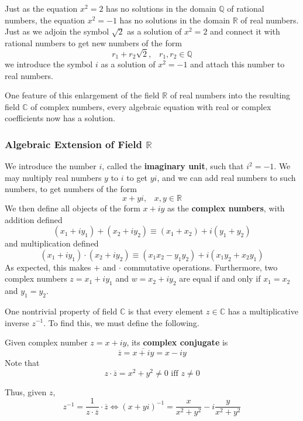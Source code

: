 \documentclass{article}
\begin{document}
    Just as the equation $x^2 = 2$ has no solutions in the domain $\mathbb{Q}$ of rational numbers, the equation $x^2 = -1$ has no solutions in the domain $\mathbb{R}$ of real numbers. Just as we adjoin the symbol $\sqrt{2}$ as a solution of $x^2 = 2$ and connect it with rational numbers to get new numbers of the form 
    \[r_1 + r_2 \sqrt{2}, \;\;\; r_1, r_2 \in \mathbb{Q}\]
    we introduce the symbol $i$ as a solution of $x^2 = -1$ and attach this number to real numbers. 

    One feature of this enlargement of the field $\mathbb{R}$ of real numbers into the resulting field $\mathbb{C}$ of complex numbers, every algebraic equation with real or complex coefficients now has a solution. 

    \subsubsection[Algebraic Extension of Field R]{Algebraic Extension of Field $\mathbb{R}$}
    We introduce the number $i$, called the \textbf{imaginary unit}, such that $i^2 = -1$. We may multiply real numbers $y$ to $i$ to get $yi$, and we can add real numbers to such numbers, to get numbers of the form 
    \[x + yi, \;\;\; x, y \in \mathbb{R}\]
    We then define all objects of the form $x + iy$ as the \textbf{complex numbers}, with addition defined
    \[(x_1 + i y_1) + (x_2 + i y_2) \equiv (x_1 + x_2) + i (y_1 + y_2)\]
    and multiplication defined
    \[(x_1 + i y_1) \cdot (x_2 + i y_2) \equiv (x_1 x_2 - y_1 y_2) + i (x_1 y_2 + x_2 y_1)\]
    As expected, this makes $+$ and $\cdot$ commutative operations. Furthermore, two complex numbers $z = x_1 + i y_1$ and $w = x_2 + i y_2$ are equal if and only if $x_1 = x_2$ and $y_1 = y_2$. 

    One nontrivial property of field $\mathbb{C}$ is that every element $z \in \mathbb{C}$ has a multiplicative inverse $z^{-1}$. To find this, we must define the following. 

    \begin{definition}
      Given complex number $z = x + i y$, its \textbf{complex conjugate} is 
      \[\overline{z} = \overline{x + iy} = x - iy\]
      Note that 
      \[z \cdot \overline{z} = x^2 + y^2 \neq 0 \text{ iff } z \neq 0\]
    \end{definition}

    Thus, given $z$, 
    \[z^{-1} = \frac{1}{z \cdot \overline{z}} \cdot \overline{z} \iff (x + yi)^{-1} = \frac{x}{x^2 + y^2} - i \frac{y}{x^2 + y^2}\]
\end{document}
